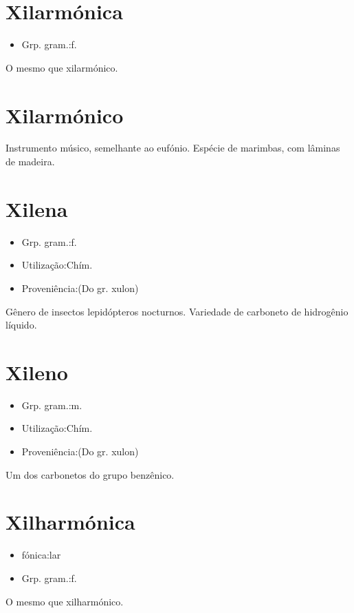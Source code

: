 \section{Xilarmónica}
\begin{itemize}
\item {Grp. gram.:f.}
\end{itemize}
O mesmo que \textunderscore xilarmónico\textunderscore .
\section{Xilarmónico}
Instrumento músico, semelhante ao eufónio.
Espécie de marimbas, com lâminas de madeira.
\section{Xilena}
\begin{itemize}
\item {Grp. gram.:f.}
\end{itemize}
\begin{itemize}
\item {Utilização:Chím.}
\end{itemize}
\begin{itemize}
\item {Proveniência:(Do gr. \textunderscore xulon\textunderscore )}
\end{itemize}
Gênero de insectos lepidópteros nocturnos.
Variedade de carboneto de hidrogênio líquido.
\section{Xileno}
\begin{itemize}
\item {Grp. gram.:m.}
\end{itemize}
\begin{itemize}
\item {Utilização:Chím.}
\end{itemize}
\begin{itemize}
\item {Proveniência:(Do gr. \textunderscore xulon\textunderscore )}
\end{itemize}
Um dos carbonetos do grupo benzênico.
\section{Xilharmónica}
\begin{itemize}
\item {fónica:lar}
\end{itemize}
\begin{itemize}
\item {Grp. gram.:f.}
\end{itemize}
O mesmo que \textunderscore xilharmónico\textunderscore .
